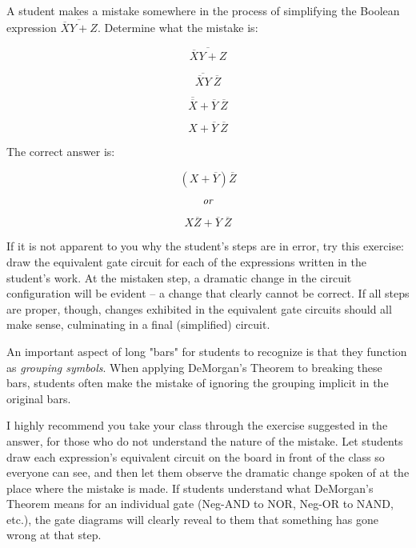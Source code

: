 

A student makes a mistake somewhere in the process of simplifying the Boolean expression $\overline{\overline{X}Y + Z}$.  Determine what the mistake is:

$$\overline{\overline{X}Y + Z}$$

$$\overline{\overline{X}Y} \> \overline{Z}$$

$$\overline{\overline{X}} + \overline{Y} \> \overline{Z}$$

$$X + \overline{Y} \> \overline{Z}$$







The correct answer is: 

$$(X + \overline{Y})\overline{Z}$$

$$\hbox{\it or}$$

$$X\overline{Z} + \overline{Y} \> \overline{Z}$$

If it is not apparent to you why the student's steps are in error, try this exercise: draw the equivalent gate circuit for each of the expressions written in the student's work.  At the mistaken step, a dramatic change in the circuit configuration will be evident -- a change that clearly cannot be correct.  If all steps are proper, though, changes exhibited in the equivalent gate circuits should all make sense, culminating in a final (simplified) circuit.







An important aspect of long "bars" for students to recognize is that they function as {\it grouping symbols}.  When applying DeMorgan's Theorem to breaking these bars, students often make the mistake of ignoring the grouping implicit in the original bars.

I highly recommend you take your class through the exercise suggested in the answer, for those who do not understand the nature of the mistake.  Let students draw each expression's equivalent circuit on the board in front of the class so everyone can see, and then let them observe the dramatic change spoken of at the place where the mistake is made.  If students understand what DeMorgan's Theorem means for an individual gate (Neg-AND to NOR, Neg-OR to NAND, etc.), the gate diagrams will clearly reveal to them that something has gone wrong at that step.

